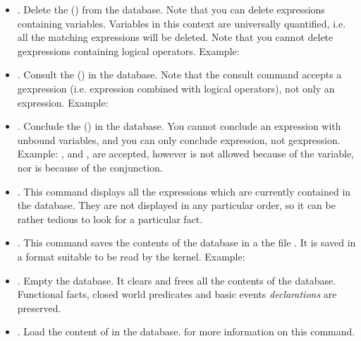 \begin{itemize}

\item {}. Delete the 
() from the database. Note that you can delete
expressions containing variables. Variables in this context are universally
quantified, i.e. all the matching expressions will be deleted. Note that you
cannot delete gexpressions containing logical operators.\*
Example: \*

\item {}. Consult the 
() in the database. Note that the consult
command accepts a gexpression (i.e. expression combined with logical
operators), not only an expression.\*
Example: \*
\*

\item {}. Conclude the 
() in the database. You cannot conclude an
expression with unbound variables, and you can only conclude expression, not
gexpression.\*
Example: , and\*
, are accepted, however\*
 is not allowed because of the variable, nor is\*
 because of the conjunction.


\item {}. This command displays all the expressions which
are currently contained in the database. They are not displayed in any
particular order, so it can be rather tedious to look for a particular fact.

\item {}. This command saves the contents of the
database in a the file . It is saved in a format suitable to be
read by the kernel. \*
Example: \*

\item {}. Empty the database. It clears and frees all the contents
of the database. Functional facts, closed world predicates and basic events
\emph{declarations} are preserved.

\item {}. Load the content of 
in the database.  for more information on
this command.

\end{itemize}

